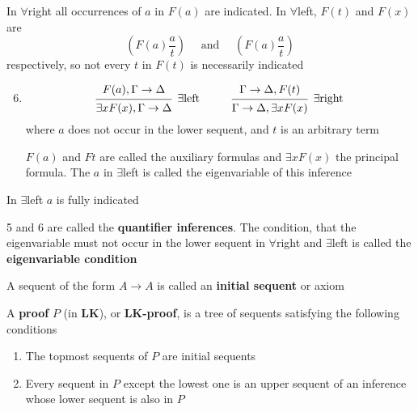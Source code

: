 \documentclass[11pt]{article}
\def \LK {\textbf{LK}}
\begin{document}
\begin{definition}[]
In \(\forall\)right all occurrences of \(a\) in \(F(a)\) are indicated. In
\(\forall\)left, \(F(t)\) and \(F(x)\) are
\begin{equation*}
\left(F(a)\frac{a}{t}
\right)\quad\text{ and }\quad
\left(F(a)\frac{a}{t}
\right)
\end{equation*}
respectively, so not every \(t\) in \(F(t)\) is necessarily indicated

\begin{enumerate}
\setcounter{enumi}{5}
\item \begin{equation*}
\begin{prooftree}%
\hypo{F(a),\Gamma\to\Delta}
\infer1[\(\exists\)left]{\exists xF(x),\Gamma\to\Delta}
\end{prooftree}\hspace{1cm}
\begin{prooftree}%
\hypo{\Gamma\to\Delta,F(t)}
\infer1[\(\exists\)right]{\Gamma\to\Delta,\exists xF(x)}
\end{prooftree}
\end{equation*}
where \(a\) does not occur in the lower sequent, and \(t\) is an arbitrary
term

\(F(a)\) and \(Ft\) are called the auxiliary formulas and \(\exists xF(x)\) the
principal formula. The \(a\) in \(\exists\)left is called the
eigenvariable of this inference
\end{enumerate}


In \(\exists\)left \(a\) is fully indicated

5 and 6 are called the \textbf{quantifier inferences}. The condition, that the
eigenvariable must not occur in the lower sequent in \(\forall\)right and
\(\exists\)left is called the \textbf{eigenvariable condition}

A sequent of the form \(A\to A\) is called an \textbf{initial sequent} or axiom
\end{definition}

\begin{definition}[]
A \textbf{proof} \(P\) (in \(\LK\)), or \textbf{\(\LK\)-proof}, is a tree of sequents
satisfying the following conditions
\begin{enumerate}
\item The topmost sequents of \(P\) are initial sequents
\item Every sequent in \(P\) except the lowest one is an upper sequent of an
inference whose lower sequent is also in \(P\)
\end{enumerate}
\end{definition}
\end{document}
